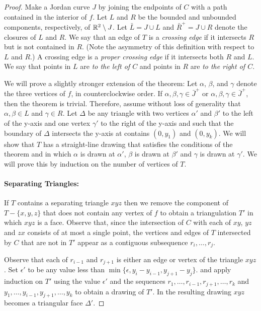 \documentclass{patmorin}
\begin{document}
\begin{proof}
   Make a Jordan curve $J$ by joining the endpoints of $C$ with a path
   contained in the interior of $f$.  Let $L$ and $R$ be the bounded
   and unbounded components, respectively, of $\mathbb{R}^2\setminus J$. Let
   $\bar{L}=J\cup L$ and $\bar{R}^+=J\cup R$ denote the closures of $L$
   and $R$.  We say that an edge of $T$ is a \emph{crossing edge} if
   it intersects $R$ but is not contained in $R$.  (Note the asymmetry
   of this definition with respect to $L$ and $R$.)  A crossing edge
   is a \emph{proper crossing edge} if it intersects both $R$ and $L$.
   We say that points in $L$ are \emph{to the left of $C$} and points
   in $R$ are \emph{to the right of $C$}.

   We will prove a slightly stronger extension of the theorem: 
   Let $\alpha$, $\beta$, and $\gamma$
   denote the three vertices of $f$, in counterclockwise order.
   If $\alpha,\beta,\gamma\in \bar{J}^+$ or $\alpha,\beta,\gamma\in \bar{J}^+$,
   then the theorem is trivial.  Therefore,  
   assume without loss of generality that $\alpha,\beta\in L$
   and $\gamma\in R$.  Let $\Delta$ be any triangle with two
   vertices $\alpha'$ and $\beta'$ to the left of the y-axis and one
   vertex $\gamma'$ to the right of the y-axis and such that the boundary
   of $\Delta$ intersects the y-axis at contains $(0,y_1)$ and $(0,y_k)$.
   We will show that $T$ has a straight-line drawing that satisfies the
   conditions of the theorem and in which $\alpha$ is drawn at $\alpha'$,
   $\beta$ is drawn at $\beta'$ and $\gamma$ is drawn at $\gamma'$.
   We will prove this by induction on the number of vertices of $T$.

   \paragraph{Separating Triangles:}
   If $T$ contains a separating triangle $xyz$ then we remove the
   component of $T-\{x,y,z\}$ that does not contain any vertex of $f$ to
   obtain a triangulation $T'$ in which $xyz$ is a face.  Observe that,
   since the intersection of $C$ with each of $xy$, $yz$ and $zx$
   consists of at most a single point, the vertices and edges of $T$
   intersected by $C$ that are not in $T'$ appear as a contiguous
   subsequence $r_i,\ldots,r_j$.

   Observe that each of $r_{i-1}$ and $r_{j+1}$ is either an edge
   or vertex of the triangle $xyz$.  Set $\epsilon'$ to be any
   value less than $\min\{\epsilon,y_{i}-y_{i-1}, y_{j+1}-y_j\}$.
   and apply induction on $T'$ using the value $\epsilon'$
   and the sequences $r_1,\ldots,r_{i-1},r_{j+1},\ldots,r_k$ and
   $y_1,\ldots,y_{i-1},y_{j+1},\ldots,y_k$ to obtain a drawing of $T'$.
   In the resulting drawing $xyz$ becomes a triangular face $\Delta'$.


\end{proof}
\end{document}
